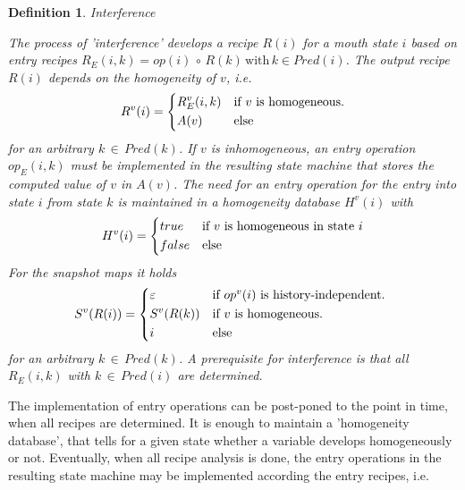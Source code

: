\documentclass[12pt,a4paper]{scrartcl}
\newtheorem{definition}{Definition}
\begin{document}
\begin{definition} Interference

The process of 'interference' develops a recipe $R(i)$ for a mouth state $i$
based on entry recipes $R_E(i,k) = op(i)\,\circ\,R(k)\,\mbox{with}\,k \in Pred(i)$.
The output recipe $R(i)$ depends on the homogeneity of $v$, i.e. 
\begin{equation} \label{eq:interference-output}
    R^v(i) = \begin{dcases*}
              R_E^v(i,k) & if $v$ is homogeneous.\\
              A(v)       & else
             \end{dcases*}
\end{equation}
for an arbitrary $k\,\in\,Pred(k)$. If $v$ is inhomogeneous, an entry
operation $op_E(i,k)$ must be implemented in the resulting state machine that
stores the computed value of $v$ in $A(v)$. The need for an entry operation
for the entry into state $i$ from state $k$ is maintained in a homogeneity
database $H^v(i)$ with
\begin{equation} \label{eq:homogeneity-database}
    H^v(i) = \begin{dcases*}
                  true  & if $v$ is homogeneous in state $i$\\
                  false & else
             \end{dcases*}
\end{equation}
For the snapshot maps it holds
\begin{equation} \label{eq:interference-snap-shot-maps}
    S^v(R(i)) = \begin{dcases*}
                  \varepsilon & if $op^v(i)$ is history-independent. \\
                  S^v(R(k))   & if $v$ is homogeneous.\\
                  i           & else
                \end{dcases*}
\end{equation}
for an arbitrary $k\,\in\,Pred(k)$. A prerequisite for interference is that 
all $R_E(i,k)$ with $k\,\in\,Pred(i)$ are determined.
\end{definition}

The implementation of entry operations can be post-poned to the point in time,
when all recipes are determined. It is enough to maintain a 'homogeneity
database', that tells for a given state whether a variable develops
homogeneously or not. Eventually, when all recipe analysis is done, the entry
operations in the resulting state machine may be implemented according the
entry recipes, i.e.
\end{document}
